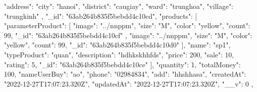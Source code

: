
{

    {
        "address": {
            "city": "hanoi",
            "district": "caugiay",
            "ward": "trunghoa",
            "village": "trungkinh"
            },
            "_id": "63ab264b835f5bebdd4c10cd",
            "products": [
                {
                    "parameterProduct": [
                        {
                            "image": "../nnppm",
                            "size": "M",
                            "color": "yellow",
                            "count": 99,
                            "_id": "63ab264b835f5bebdd4c10cf"
                        },
                        {
                            "image": "../nnppm",
                            "size": "M",
                            "color": "yellow",
                            "count": 99,
                            "_id": "63ab264b835f5bebdd4c10d0"
                        }
                    ],
                    "name": "sp1",
                    "typeProduct": "quan",
                    "description": "hdhkskhhfds",
                    "price": 200,
                    "sale": 10,
                    "rating": 5,
                    "_id": "63ab264b835f5bebdd4c10ce"
                }
                ],
                    "quantity": 1,
                    "totalMoney": 100,
                    "nameUserBuy": "ao",
                    "phone": "02984834",
                    "add": "hhshhasa",
                    "createdAt": "2022-12-27T17:07:23.320Z",
                    "updatedAt": "2022-12-27T17:07:23.320Z",
                    "__v": 0
        },
        
}
